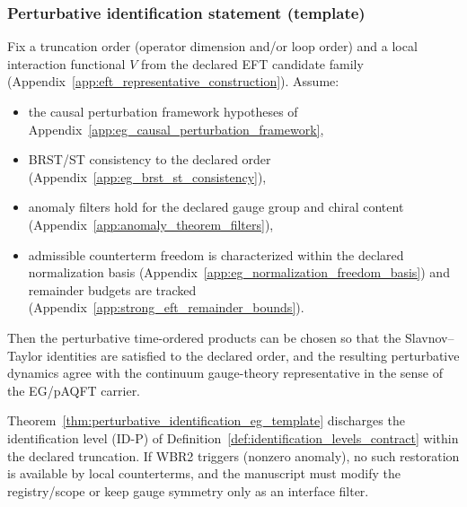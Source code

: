 \subsubsection{Perturbative identification statement (template)}
\begin{theorem}
\label{thm:perturbative_identification_eg_template}
\MathTag Fix a truncation order (operator dimension and/or loop order) and a local interaction functional $V$ from the declared EFT candidate family (Appendix~\ref{app:eft_representative_construction}).
Assume:
\begin{itemize}
\item the causal perturbation framework hypotheses of Appendix~\ref{app:eg_causal_perturbation_framework},
\item BRST/ST consistency to the declared order (Appendix~\ref{app:eg_brst_st_consistency}),
\item anomaly filters hold for the declared gauge group and chiral content (Appendix~\ref{app:anomaly_theorem_filters}),
\item admissible counterterm freedom is characterized within the declared normalization basis (Appendix~\ref{app:eg_normalization_freedom_basis}) and remainder budgets are tracked (Appendix~\ref{app:strong_eft_remainder_bounds}).
\end{itemize}
Then the perturbative time-ordered products can be chosen so that the Slavnov--Taylor identities are satisfied to the declared order, and the resulting perturbative dynamics agree with the continuum gauge-theory representative in the sense of the EG/pAQFT carrier.
\end{theorem}

\AuditTag Theorem~\ref{thm:perturbative_identification_eg_template} discharges the identification level (ID-P) of Definition~\ref{def:identification_levels_contract} within the declared truncation.
If WBR2 triggers (nonzero anomaly), no such restoration is available by local counterterms, and the manuscript must modify the registry/scope or keep gauge symmetry only as an interface filter.

